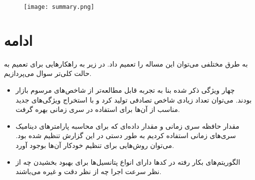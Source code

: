 \documentclass{scribe-cgenomics}
\begin{document}
\begin{figure}[H]\label{summary}
\texttt{[image: summary.png]}
\centering
\end{figure}




\section{ادامه}

به طرق مختلفی می‌توان این مساله را تعمیم داد. در زیر به راهکارهایی برای تعمیم به حالت کلی‌تر سوال می‌پردازیم.

\begin{itemize}
\item{
چهار ویژگی ذکر شده بنا به تجربه قابل مطالعه‌تر از شاخص‌های مرسوم بازار بودند. می‌توان تعداد زیادی شاخص تصادفی تولید کرد و با استخراج ویژگی‌های جدید مناسب از آن‌ها برای استفاده در سری زمانی بهره گرفت.
}
\item{
مقدار حافظه سری زمانی و مقدار داده‌ای که برای محاسبه پارامترهای دینامیک سری‌های زمانی استفاده کردیم به طور دستی در این گزارش تنظیم شده بود. می‌توان روش‌هایی برای تنظیم خودکار آن‌ها بوجود آورد.
}
\item{
الگوریتم‌های بکار رفته در کدها دارای انواع پتانسیل‌ها برای بهبود بخشیدن چه از نظر سرعت اجرا چه از نظر دقت و غیره می‌باشند.
}
\end{itemize}







\end{document}
